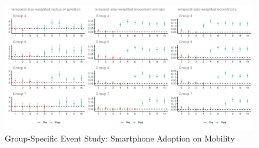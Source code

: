 \clearpage\newpage
\begin{figure}[ht!]
\centering
\caption{Group-Specific Event Study: Smartphone Adoption on Mobility}

\includegraphics[width=1.5\textwidth, angle=90]{figures/csdid/cohort_specific_ATT_dynamics/smartphone_adoption_mobility.png}

\label{fig:attgt_smartphone_adoption_mobility}
\end{figure}
